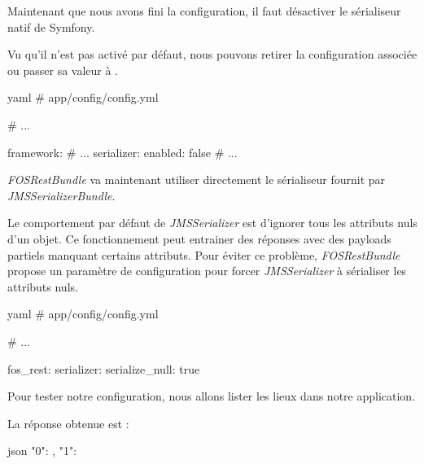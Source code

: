 \documentclass[big]{zmdocument}
\begin{document}


Maintenant que nous avons fini la configuration, il faut désactiver le sérialiseur natif de Symfony.



Vu qu'il n'est pas activé par défaut, nous pouvons retirer la configuration associée ou passer sa valeur à .



\begin{CodeBlock}{yaml}
# app/config/config.yml

# ...

framework:
    # ...
    serializer:
        enabled: false
# ...
\end{CodeBlock}



\textit{FOSRestBundle} va maintenant utiliser directement le sérialiseur fournit par \textit{JMSSerializerBundle}.





Le comportement par défaut de \textit{JMSSerializer} est d'ignorer tous les attributs nuls d'un objet. Ce fonctionnement peut entrainer des réponses avec des payloads partiels manquant certains attributs.
Pour éviter ce problème, \textit{FOSRestBundle} propose un paramètre de configuration pour forcer \textit{JMSSerializer} à sérialiser les attributs nuls.



\begin{CodeBlock}{yaml}
# app/config/config.yml

# ...

fos_rest:
    serializer:
        serialize_null:  true
\end{CodeBlock}







Pour tester notre configuration, nous allons lister les lieux dans notre application.



La réponse obtenue est :



\begin{CodeBlock}{json}
{
  "0": {},
  "1": {}
}
\end{CodeBlock}
\end{document}
